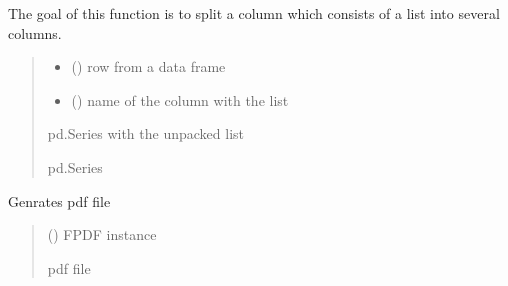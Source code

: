 \documentclass[letterpaper,10pt,english]{sphinxmanual}
\begin{document}

\begin{fulllineitems}
\label{\detokenize{auxilary_functions:auxilary_functions.split_list}}
\pysigstartsignatures
{}
\pysigstopsignatures
\sphinxAtStartPar
The goal of this function is to split a column which consists of a list into several columns.
\begin{quote}\begin{description}
\begin{itemize}
\item {} 
\sphinxAtStartPar
{} () \textendash{} row from a data frame

\item {} 
\sphinxAtStartPar
{} () \textendash{} name of the column with the list

\end{itemize}

\sphinxAtStartPar
pd.Series with the unpacked list

\sphinxAtStartPar
pd.Series

\end{description}\end{quote}

\end{fulllineitems}


\begin{fulllineitems}
\label{\detokenize{auxilary_functions:auxilary_functions.start_page}}
\pysigstartsignatures
{}
\pysigstopsignatures
\sphinxAtStartPar
Genrates pdf file
\begin{quote}\begin{description}
\sphinxAtStartPar
{} () \textendash{} FPDF instance

\sphinxAtStartPar
pdf file

\end{description}\end{quote}

\end{fulllineitems}
\end{document}
